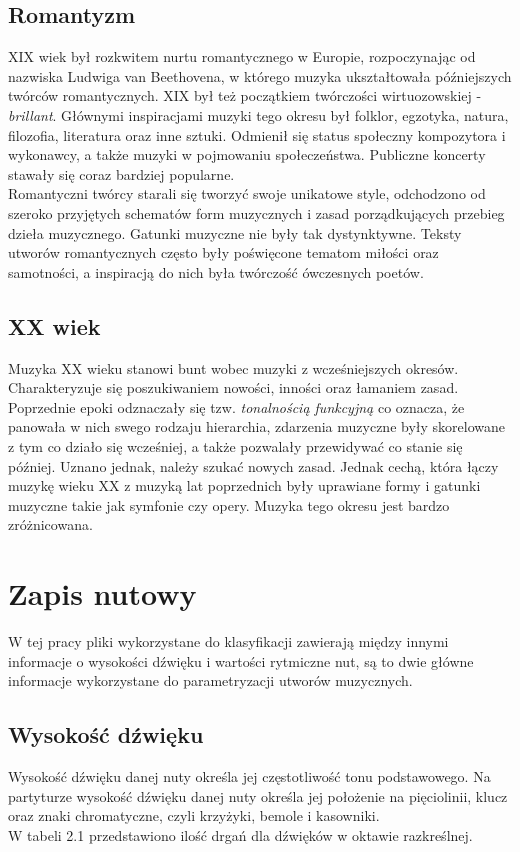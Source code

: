 \documentclass[printmode, eng, openany]{mgr}
\newcommand\tab[1][1cm]{\hspace*{#1}}
\begin{document}
\subsection{Romantyzm}
\tab XIX wiek był rozkwitem nurtu romantycznego w Europie, rozpoczynając od nazwiska Ludwiga van Beethovena, w którego muzyka ukształtowała późniejszych twórców romantycznych. XIX był też początkiem twórczości wirtuozowskiej - \textit{brillant}. Głównymi inspiracjami muzyki tego okresu był folklor, egzotyka, natura, filozofia, literatura oraz inne sztuki. Odmienił się status społeczny kompozytora i wykonawcy, a także muzyki w pojmowaniu społeczeństwa. Publiczne koncerty stawały się coraz bardziej popularne.\\
\tab Romantyczni twórcy starali się tworzyć swoje unikatowe style, odchodzono od szeroko przyjętych schematów form muzycznych i zasad porządkujących przebieg dzieła muzycznego. Gatunki muzyczne nie były tak dystynktywne. Teksty utworów romantycznych często były poświęcone tematom miłości oraz samotności, a inspiracją do nich była twórczość ówczesnych poetów.
\subsection{XX wiek}
\tab Muzyka XX wieku stanowi bunt wobec muzyki z wcześniejszych okresów. Charakteryzuje się poszukiwaniem nowości, inności oraz łamaniem zasad. Poprzednie epoki odznaczały się tzw. \textit{tonalnością funkcyjną} co oznacza, że panowała w nich swego rodzaju hierarchia, zdarzenia muzyczne były skorelowane z tym co działo się wcześniej, a także pozwalały przewidywać co stanie się później. Uznano jednak, należy szukać nowych zasad. Jednak cechą, która łączy muzykę wieku XX z muzyką lat poprzednich były uprawiane formy i gatunki muzyczne takie jak symfonie czy opery. Muzyka tego okresu jest bardzo zróżnicowana.
\section{Zapis nutowy}
\tab W tej pracy pliki wykorzystane do klasyfikacji zawierają między innymi informacje o wysokości dźwięku i wartości rytmiczne nut, są to dwie główne informacje wykorzystane do parametryzacji utworów muzycznych.
\subsection{Wysokość dźwięku}
\tab Wysokość dźwięku danej nuty określa jej częstotliwość tonu podstawowego. Na partyturze wysokość dźwięku danej nuty określa jej położenie na pięciolinii, klucz oraz znaki chromatyczne, czyli krzyżyki, bemole i kasowniki.\\ W tabeli 2.1 przedstawiono ilość drgań dla dźwięków w oktawie razkreślnej.
\end{document}
